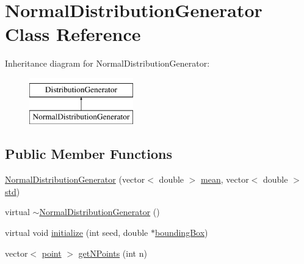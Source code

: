 \hypertarget{class_normal_distribution_generator}{}\section{Normal\+Distribution\+Generator Class Reference}
\label{class_normal_distribution_generator}
Inheritance diagram for Normal\+Distribution\+Generator\+:\begin{figure}[H]
\begin{center}
\leavevmode
\includegraphics[height=2.000000cm]{df/d2c/class_normal_distribution_generator}
\end{center}
\end{figure}
\subsection*{Public Member Functions}
\begin{DoxyCompactItemize}
\item 
\hyperlink{class_normal_distribution_generator_af87979852ba8370cdb2d368077246038}{Normal\+Distribution\+Generator} (vector$<$ double $>$ \hyperlink{class_normal_distribution_generator_a64b8ae4a574846641023d954e3143ce9}{mean}, vector$<$ double $>$ \hyperlink{class_normal_distribution_generator_ab41e9da41497d0f6491064f4b27f5123}{std})
\item 
virtual \hyperlink{class_normal_distribution_generator_ac52595dc2f9f25083e8a6b6878df3d5d}{$\sim$\+Normal\+Distribution\+Generator} ()
\item 
virtual void \hyperlink{class_normal_distribution_generator_a858dfdfc16ab4367bf41ed76831eae45}{initialize} (int seed, double $\ast$\hyperlink{class_distribution_generator_abbb670b1d48a4820559097b85bf6ee2d}{bounding\+Box})
\item 
vector$<$ \hyperlink{structpoint}{point} $>$ \hyperlink{class_normal_distribution_generator_abad3d89c150cf60744bab34dba3b3367}{get\+N\+Points} (int n)
\end{DoxyCompactItemize}
